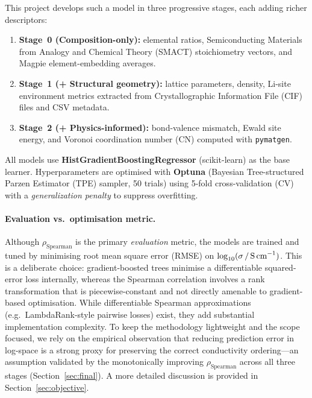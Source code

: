 \documentclass[11pt,a4paper]{article}
\newcommand{\logsigma}{\log_{10}(\sigma\,/\,\text{S\,cm}^{-1})}
\newcommand{\rhoS}{\rho_{\text{Spearman}}}
\begin{document}
This project develops such a model in three progressive stages, each adding
richer descriptors:

\begin{enumerate}[leftmargin=*]
      \item \textbf{Stage~0 (Composition-only):} elemental ratios,
            Semiconducting Materials from Analogy and Chemical Theory (SMACT)
            stoichiometry vectors, and Magpie element-embedding averages.
      \item \textbf{Stage~1 (+ Structural geometry):} lattice parameters, density,
            Li-site environment metrics extracted from Crystallographic
            Information File (CIF) files and CSV metadata.
      \item \textbf{Stage~2 (+ Physics-informed):} bond-valence mismatch, Ewald
            site energy, and Voronoi coordination number (CN) computed with
            \texttt{pymatgen}.
\end{enumerate}

All models use \textbf{HistGradientBoostingRegressor} (scikit-learn) as the
base learner.  Hyperparameters are optimised with \textbf{Optuna} (Bayesian
Tree-structured Parzen Estimator (TPE) sampler, 50 trials) using 5-fold
cross-validation (CV) with a \emph{generalization penalty} to suppress
overfitting.

\paragraph{Evaluation vs.\ optimisation metric.}
Although $\rhoS$ is the primary \emph{evaluation} metric, the models are
trained and tuned by minimising root mean square error (RMSE) on
$\logsigma$.  This is a deliberate choice: gradient-boosted trees minimise a
differentiable squared-error loss internally, whereas the Spearman
correlation involves a rank transformation that is piecewise-constant and
not directly amenable to gradient-based optimisation.  While differentiable
Spearman approximations (e.g.\ LambdaRank-style pairwise losses) exist, they
add substantial implementation complexity.  To keep the methodology
lightweight and the scope focused, we rely on the empirical observation that
reducing prediction error in log-space is a strong proxy for preserving the
correct conductivity ordering---an assumption validated by the monotonically
improving $\rhoS$ across all three stages (Section~\ref{sec:final}).  A
more detailed discussion is provided in Section~\ref{sec:objective}.

\end{document}
